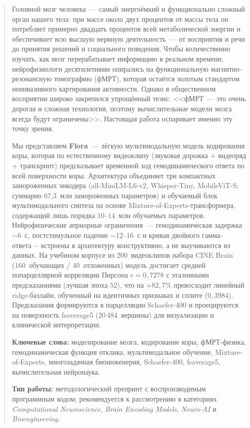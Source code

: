 \documentclass[11pt,a4paper]{article}
\begin{document}
\begin{quote}
\noindent\small
Головной мозг человека~--- самый энергоёмкий и функционально сложный орган
нашего тела: при массе около двух процентов от массы тела он потребляет
примерно двадцать процентов всей метаболической энергии и обеспечивает
всю высшую нервную деятельность~--- от восприятия и речи до принятия
решений и социального поведения. Чтобы количественно изучать, как мозг
перерабатывает информацию в реальном времени, нейрофизиологи
десятилетиями опирались на функциональную магнитно-резонансную
томографию (фМРТ), которая остаётся золотым стандартом неинвазивного
картирования активности. Однако в общественном восприятии широко
закрепился упрощённый тезис: <<фМРТ~--- это очень дорогая и сложная
технология, поэтому вычислительные модели мозга всегда будут
ограничены>>. Настоящая работа оспаривает именно эту точку зрения.

Мы представляем \textbf{Flora}~--- лёгкую мультимодальную модель
кодирования коры, которая по естественному видеоклипу (звуковая
дорожка + видеоряд + транскрипт) предсказывает временной ход
гемодинамического ответа по всей поверхности коры. Архитектура
объединяет три компактных замороженных энкодера
(all-MiniLM-L6-v2, Whisper-Tiny, MobileViT-S; суммарно
67{,}3~млн замороженных параметров) и обучаемый блок мультимодального
синтеза на основе Mixture-of-Experts-трансформера, содержащий лишь
порядка $10$--$14$~млн обучаемых параметров. Нейрофизические априорные
ограничения~--- гемодинамическая задержка $\sim$6~с, постстимульное
падение $\sim$12--16~с и кривая двойного гамма-ответа~-~встроены в
архитектуру конструктивно, а не выучиваются из данных. На учебнном
корпусе из $200$~видеоклипов набора CINE Brain (160~обучающих /
40~отложенных) модель достигает средней попарцеллярной корреляции
Пирсона $r = 0{,}7278$ с эталонными предсказаниями
(лучшая эпоха $52$), что на $+82{,}7\%$ превосходит линейный
ridge-базлайн, обученный на идентичных признаках и сплите
($0{,}3984$). Предсказания формируются в парцелляции Schaefer-400 и
проецируются на поверхность fsaverage5 (20\,484~вершины) для
визуализации и клинической интерпретации.

\medskip
\noindent\textbf{Ключевые слова:} моделирование мозга, кодирование коры,
фМРТ-физика, гемодинамическая функция отклика, мультимодальное обучение,
Mixture-of-Experts, многозадачная биоинженерия, Schaefer-400, fsaverage5,
вычислительная нейронаука.

\medskip
\noindent\textbf{Тип работы:} методологический препринт с воспроизводимым
программным кодом; рекомендуется к рассмотрению в категориях
\emph{Computational Neuroscience}, \emph{Brain Encoding Models},
\emph{Neuro-AI} и \emph{Bioengineering}.
\end{quote}
\end{document}

